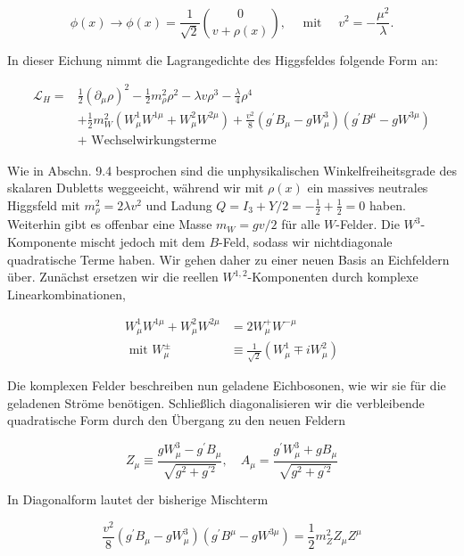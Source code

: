 \documentclass[10pt, letterpaper]{article}
\begin{document}
$$
\phi(x) \rightarrow \phi(x)=\frac{1}{\sqrt{2}}\binom{0}{v+\rho(x)}, \quad \text { mit } \quad v^{2}=-\frac{\mu^{2}}{\lambda} .
$$

In dieser Eichung nimmt die Lagrangedichte des Higgsfeldes folgende Form an:

$$
\begin{aligned}
\mathscr{L}_{H}= & \frac{1}{2}\left(\partial_{\mu} \rho\right)^{2}-\frac{1}{2} m_{\rho}^{2} \rho^{2}-\lambda v \rho^{3}-\frac{\lambda}{4} \rho^{4} \\
& +\frac{1}{2} m_{W}^{2}\left(W_{\mu}^{1} W^{1 \mu}+W_{\mu}^{2} W^{2 \mu}\right)+\frac{v^{2}}{8}\left(g^{\prime} B_{\mu}-g W_{\mu}^{3}\right)\left(g^{\prime} B^{\mu}-g W^{3 \mu}\right) \\
& + \text { Wechselwirkungsterme }
\end{aligned}
$$

Wie in Abschn. 9.4 besprochen sind die unphysikalischen Winkelfreiheitsgrade des skalaren Dubletts weggeeicht, während wir mit $\rho(x)$ ein massives neutrales Higgsfeld mit $m_{\rho}^{2}=2 \lambda v^{2}$ und Ladung $Q=I_{3}+Y / 2=-\frac{1}{2}+\frac{1}{2}=0$ haben. Weiterhin gibt es offenbar eine Masse $m_{W}=g v / 2$ für alle $W$-Felder. Die $W^{3}$-Komponente mischt jedoch mit dem $B$-Feld, sodass wir nichtdiagonale quadratische Terme haben. Wir gehen daher zu einer neuen Basis an Eichfeldern über. Zunächst ersetzen wir die reellen $W^{1,2}$-Komponenten durch komplexe Linearkombinationen,

$$
\begin{aligned}
W_{\mu}^{1} W^{1 \mu}+W_{\mu}^{2} W^{2 \mu} & =2 W_{\mu}^{+} W^{-\mu} \\
\text { mit } W_{\mu}^{ \pm} & \equiv \frac{1}{\sqrt{2}}\left(W_{\mu}^{1} \mp i W_{\mu}^{2}\right)
\end{aligned}
$$

Die komplexen Felder beschreiben nun geladene Eichbosonen, wie wir sie für die geladenen Ströme benötigen. Schließlich diagonalisieren wir die verbleibende quadratische Form durch den Übergang zu den neuen Feldern

$$
Z_{\mu} \equiv \frac{g W_{\mu}^{3}-g^{\prime} B_{\mu}}{\sqrt{g^{2}+g^{\prime 2}}}, \quad A_{\mu}=\frac{g^{\prime} W_{\mu}^{3}+g B_{\mu}}{\sqrt{g^{2}+g^{\prime 2}}}
$$

In Diagonalform lautet der bisherige Mischterm

$$
\frac{v^{2}}{8}\left(g^{\prime} B_{\mu}-g W_{\mu}^{3}\right)\left(g^{\prime} B^{\mu}-g W^{3 \mu}\right)=\frac{1}{2} m_{Z}^{2} Z_{\mu} Z^{\mu}
$$
\end{document}
